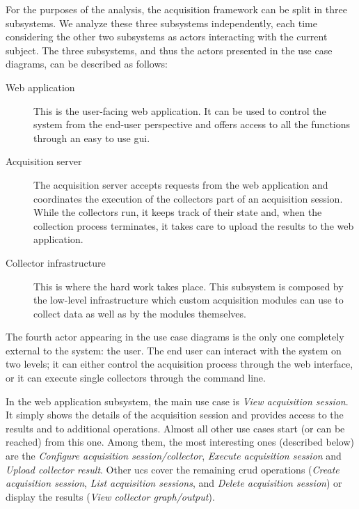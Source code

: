 For the purposes of the analysis, the acquisition framework can be split in three subsystems. We analyze these three subsystems independently, each time considering the other two subsystems as actors interacting with the current subject. The three subsystems, and thus the actors presented in the use case diagrams, can be described as follows:

\begin{description}
  \item[Web application] This is the user-facing web application. It can be used to control the system from the end-user perspective and offers access to all the functions through an easy to use \gls{gui}.
  \item[Acquisition server] The acquisition server accepts requests from the web application and coordinates the execution of the collectors part of an acquisition session. While the collectors run, it keeps track of their state and, when the collection process terminates, it takes care to upload the results to the web application.
  \item[Collector infrastructure] This is where the hard work takes place. This subsystem is composed by the low-level infrastructure which custom acquisition modules can use to collect data as well as by the modules themselves.
\end{description}

The fourth actor appearing in the use case diagrams is the only one completely external to the system: the user. The end user can interact with the system on two levels; it can either control the acquisition process through the web interface, or it can execute single collectors through the command line.

In the web application subsystem, the main use case is \emph{View acquisition session}. It simply shows the details of the acquisition session and provides access to the results and to additional operations. Almost all other use cases start (or can be reached) from this one. Among them, the most interesting ones (described below) are the \emph{Configure acquisition session/collector}, \emph{Execute acquisition session} and \emph{Upload collector result}. Other \glspl{uc} cover the remaining \gls{crud} operations (\emph{Create acquisition session}, \emph{List acquisition sessions}, and \emph{Delete acquisition session}) or display the results (\emph{View collector graph/output}).


